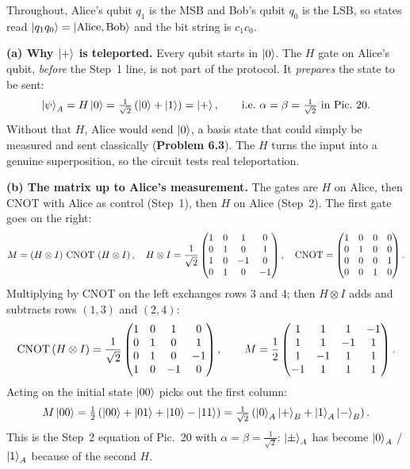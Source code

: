 \documentclass[a4paper, 10pt]{article}
\begin{document}
\begin{solution}
	\noindent Throughout, Alice's qubit \( q_1 \) is the MSB and Bob's qubit \( q_0 \) is the LSB, so states read \( \ket{q_1 q_0} = \ket{\text{Alice}, \text{Bob}} \) and the bit string is \( c_1 c_0 \).

	\noindent \textbf{(a) Why \( \ket{+} \) is teleported.} Every qubit starts in \( \ket{0} \). The \( H \) gate on Alice's qubit, \emph{before} the Step~1 line, is not part of the protocol. It \emph{prepares} the state to be sent:
	\[
		\ket{\psi}_A = H\ket{0} = \tfrac{1}{\sqrt{2}}\left(\ket{0} + \ket{1}\right) = \ket{+},
		\qquad\text{i.e.\ } \alpha = \beta = \tfrac{1}{\sqrt{2}} \text{ in Pic.~20.}
	\]
	Without that \( H \), Alice would send \( \ket{0} \), a basis state that could simply be measured and sent classically (\textbf{Problem 6.3}).
	The \( H \) turns the input into a genuine superposition, so the circuit tests real teleportation.

	\noindent \textbf{(b) The matrix up to Alice's measurement.} The gates are \( H \) on Alice, then CNOT with Alice as control (Step~1), then \( H \) on Alice (Step~2). The first gate goes on the right:
	\[
		M = \left(H \otimes I\right)\,\mathrm{CNOT}\,\left(H \otimes I\right),
		\quad
		H \otimes I = \frac{1}{\sqrt{2}}\begin{pmatrix}
			1 & 0 & 1  & 0  \\
			0 & 1 & 0  & 1  \\
			1 & 0 & -1 & 0  \\
			0 & 1 & 0  & -1
		\end{pmatrix},
		\quad
		\mathrm{CNOT} = \begin{pmatrix}
			1 & 0 & 0 & 0 \\
			0 & 1 & 0 & 0 \\
			0 & 0 & 0 & 1 \\
			0 & 0 & 1 & 0
		\end{pmatrix}.
	\]
	Multiplying by CNOT on the left exchanges rows 3 and 4; then \( H \otimes I \) adds and subtracts rows \( (1, 3) \) and \( (2, 4) \):
	\[
		\mathrm{CNOT}\left(H \otimes I\right)
		= \frac{1}{\sqrt{2}}\begin{pmatrix}
			1 & 0 & 1  & 0  \\
			0 & 1 & 0  & 1  \\
			0 & 1 & 0  & -1 \\
			1 & 0 & -1 & 0
		\end{pmatrix},
		\qquad
		M = \frac{1}{2}\begin{pmatrix}
			1  & 1  & 1  & -1 \\
			1  & 1  & -1 & 1  \\
			1  & -1 & 1  & 1  \\
			-1 & 1  & 1  & 1
		\end{pmatrix}.
	\]
	Acting on the initial state \( \ket{00} \) picks out the first column:
	\[
		M\ket{00}
		= \tfrac{1}{2}\left(\ket{00} + \ket{01} + \ket{10} - \ket{11}\right)
		= \tfrac{1}{\sqrt{2}}\left(\ket{0}_A\ket{+}_B + \ket{1}_A\ket{-}_B\right).
	\]
	This is the Step~2 equation of Pic.~20 with \( \alpha = \beta = \tfrac{1}{\sqrt{2}} \): \( \ket{\pm}_A \) has become \( \ket{0}_A \) / \( \ket{1}_A \) because of the second \( H \).


\end{solution}
\end{document}
